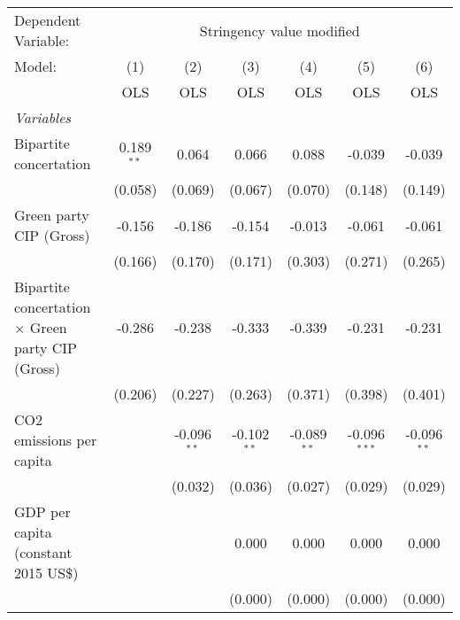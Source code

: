 
\begingroup
\centering
\begin{tabular}{lcccccc}
   \toprule
   Dependent Variable: & \multicolumn{6}{c}{Stringency value modified}\\
   Model:                                                   & (1)          & (2)           & (3)           & (4)           & (5)            & (6)\\  
                                                            &  OLS         & OLS           & OLS           & OLS           & OLS            & OLS\\  
   \midrule
   \emph{Variables}\\
   Bipartite concertation                                   & 0.189$^{**}$ & 0.064         & 0.066         & 0.088         & -0.039         & -0.039\\   
                                                            & (0.058)      & (0.069)       & (0.067)       & (0.070)       & (0.148)        & (0.149)\\   
   Green party CIP (Gross)                                  & -0.156       & -0.186        & -0.154        & -0.013        & -0.061         & -0.061\\   
                                                            & (0.166)      & (0.170)       & (0.171)       & (0.303)       & (0.271)        & (0.265)\\   
   Bipartite concertation $\times$ Green party CIP (Gross)  & -0.286       & -0.238        & -0.333        & -0.339        & -0.231         & -0.231\\   
                                                            & (0.206)      & (0.227)       & (0.263)       & (0.371)       & (0.398)        & (0.401)\\   
   CO2 emissions per capita                                 &              & -0.096$^{**}$ & -0.102$^{**}$ & -0.089$^{**}$ & -0.096$^{***}$ & -0.096$^{**}$\\   
                                                            &              & (0.032)       & (0.036)       & (0.027)       & (0.029)        & (0.029)\\   
   GDP per capita (constant 2015 US\$)                      &              &               & 0.000         & 0.000         & 0.000          & 0.000\\   
                                                            &              &               & (0.000)       & (0.000)       & (0.000)        & (0.000)\\   

\end{tabular}
